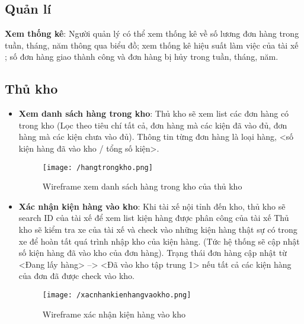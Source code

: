 \begin{itemize}
	\subsection{Quản lí}
	
	\textbf{Xem thống kê}: Người quản lý có thể  xem thống kê về số lương đơn hàng trong tuần, tháng, năm thông qua biểu đồ; xem thống kê hiệu suất làm việc của tài xế ; số đơn hàng giao thành công và đơn hàng bị hủy trong tuần, tháng, năm.
	
	
	\subsection{Thủ kho}
	\begin{itemize}
		\item \textbf{Xem danh sách hàng trong kho}: Thủ kho sẽ xem list các đơn hàng có trong kho (Lọc theo tiêu chí tất cả, đơn hàng mà các kiện đã vào đủ, đơn hàng mà các kiện chưa vào đủ). Thông tin từng đơn hàng là loại hàng, <số kiện hàng đã vào kho / tổng số kiện>. 
		
		\begin{figure}[!ht]
			\texttt{[image: /hangtrongkho.png]}
			\centering
			\linebreak
			\caption{Wireframe xem danh sách hàng trong kho của thủ kho}
		\end{figure}
		
		\item \textbf{Xác nhận kiện hàng vào kho}:
		Khi tài xế nội tỉnh đến kho, thủ kho sẽ search ID của tài xế để xem list kiện hàng được phân công của tài xế Thủ kho sẽ kiểm tra xe của tài xế và check vào những kiện hàng thật sự có trong xe để hoàn tất quá trình nhập kho của kiện hàng. (Tức hệ thống sẽ cập nhật số kiện hàng đã vào kho của đơn hàng). Trạng thái đơn hàng cập nhật từ <Đang lấy hàng>  -->  <Đã vào kho tập trung 1>  nếu tất cả các kiện hàng của đơn đã được check vào kho. 
		
		\begin{figure}[!ht]
			\texttt{[image: /xacnhankienhangvaokho.png]}
			\centering
			\linebreak
			\caption{Wireframe xác nhận kiện hàng vào kho}
		\end{figure}
		

\end{itemize}
\end{itemize}
